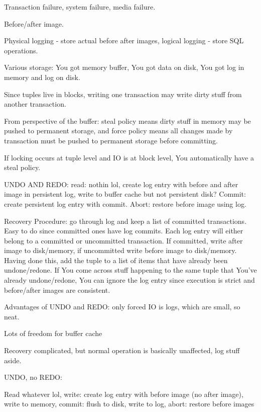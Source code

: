 \documentclass{article}
\begin{document}
		Transaction failure, system failure, media failure. 
		
		Before/after image.
		
		Physical logging - store actual before after images, logical logging - store SQL operations.
		
		Various storage: You got memory buffer, You got data on disk, You got log in memory and log on disk.
		
		Since tuples live in blocks, writing one transaction may write dirty stuff from another transaction.
		
		From perspective of the buffer: steal policy means dirty stuff in memory may be pushed to permanent storage, and force policy means all changes made by transaction must be pushed to permanent storage before committing.
		
		If locking occurs at tuple level and IO is at block level, You automatically have a steal policy.
		
		
		UNDO AND REDO: read: nothin lol, create log entry with before and after image in persistent log, write to buffer cache but not persistent disk? Commit: create persistent log entry with commit. Abort: restore before image using log.
		
		Recovery Procedure: go through log and keep a list of committed transactions. Easy to do since committed ones have log commits. Each log entry will either belong to a committed or uncommitted transaction. If committed, write after image to disk/memory, if uncommitted write before image to disk/memory. Having done this, add the tuple to a list of items that have already been undone/redone. If You come across stuff happening to the same tuple that You've already undone/redone, You can ignore the log entry since execution is strict and before/after images are consistent.
		
		Advantages of UNDO and REDO: only forced IO is logs, which are small, so neat.
		
		Lots of freedom for buffer cache
		
		Recovery complicated, but normal operation is basically unaffected, log stuff aside.
		
		UNDO, no REDO:
		
		Read whatever lol, write: create log entry with before image (no after image), write to memory, commit: flush to disk, write to log, abort: restore before images
		
		
			
		
			
	
		
	
	
		
		
		
		
		
		
\end{document}
